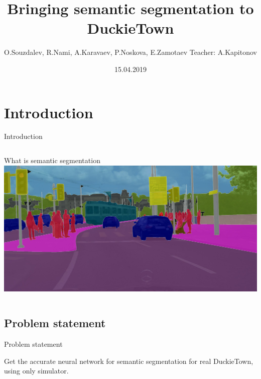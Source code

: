 \documentclass{beamer}
\title[Bringing semantic segmentation to DuckieTown]{Bringing semantic segmentation to DuckieTown}
\author[ITMO University]{O.Souzdalev, R.Nami, A.Karavaev, P.Noskova, E.Zamotaev Teacher: A.Kapitonov}
\date{15.04.2019}
\begin{document}
\begin{frame}
  \titlepage
\end{frame}

\frame{\tableofcontents}

\section{Introduction}

\begin{frame}{Introduction}

\begin{columns}
What is semantic segmentation
    \includegraphics[width=\textwidth]{fig/semantic.jpeg}



\end{columns}



\end{frame}

\subsection{Problem statement}
\begin{frame}{Problem statement}

Get the accurate neural network for semantic segmentation for real DuckieTown, using only simulator.

\end{frame}
\end{document}
